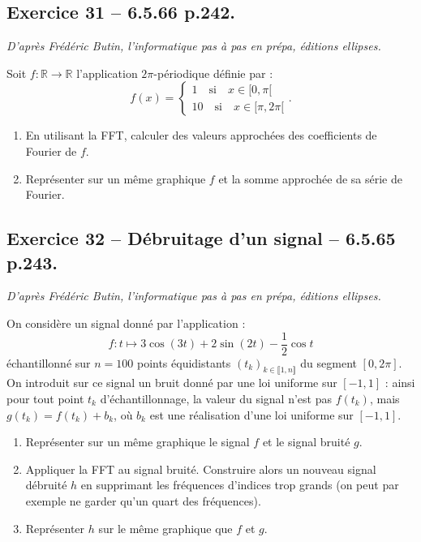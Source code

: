 \documentclass[10pt,fleqn]{article} %
\begin{document}
\begin{multicols}{2}
\subsection*{Exercice 31 -- 6.5.66 p.242.}
\begin{flushright}
\textit{D'après Frédéric Butin, l'informatique pas à pas en prépa, éditions ellipses.}
\end{flushright}
Soit $f:\mathbb{R} \to \mathbb{R}$ l'application $2\pi$-périodique définie par :
$$
f(x)=\left\{
\begin{array}{l}
1  \quad \text{si} \quad x\in[0,\pi[ \\
10  \quad \text{si} \quad x\in[\pi,2\pi[
\end{array}
\right. .
$$
\begin{enumerate}
\item En utilisant la FFT, calculer des valeurs approchées des coefficients de Fourier de $f$. 
\item Représenter sur un même graphique $f$ et la somme approchée de sa série de Fourier.
\end{enumerate}

\subsection*{Exercice 32 -- Débruitage d'un signal -- 6.5.65 p.243.}
\begin{flushright}
\textit{D'après Frédéric Butin, l'informatique pas à pas en prépa, éditions ellipses.}
\end{flushright}
On considère un signal donné par l'application :
$$
f:t \mapsto 3 \cos \left( 3t\right)+2\sin \left( 2t\right)-\dfrac{1}{2}\cos t
$$
échantillonné sur $n=100$  points équidistants $(t_k)_{k\in \llbracket 1,n\rrbracket}$ du segment $[0,2\pi]$. On introduit sur ce signal un bruit donné par une loi uniforme sur $[-1,1]$ : ainsi pour tout point $t_k$ d'échantillonnage, la valeur du signal n'est pas $f(t_k)$, mais $g(t_k) = f(t_k) + b_k$, où $b_k$ est une réalisation d'une loi uniforme sur $[-1,1]$.

\begin{enumerate}
\item Représenter sur un même graphique le signal $f$ et le signal bruité $g$.
\item Appliquer la FFT au signal bruité. Construire alors un nouveau signal débruité $h$ en supprimant les fréquences d'indices trop grands (on peut par exemple ne garder qu'un quart des fréquences).
\item Représenter $h$ sur le même graphique que $f$ et $g$.
\end{enumerate}

\end{multicols}
\end{document}
